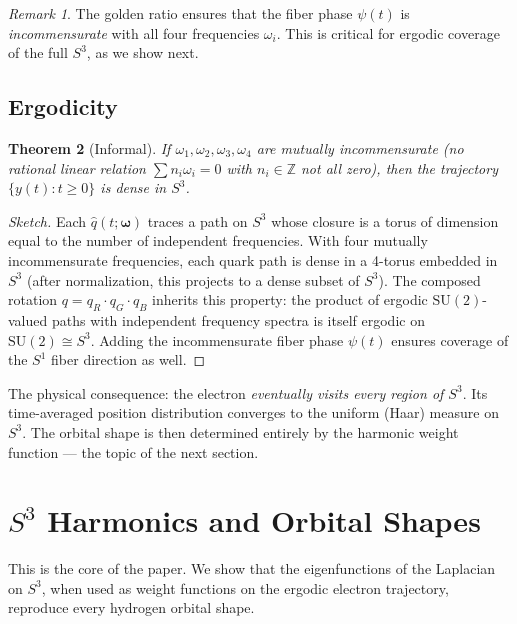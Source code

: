 \documentclass[12pt, a4paper]{article}
\newtheorem{theorem}{Theorem}[section]
\theoremstyle{definition}
\theoremstyle{remark}
\newtheorem{remark}[theorem]{Remark}
\newcommand{\Sthree}{S^3}
\newcommand{\Sone}{S^1}
\newcommand{\SU}{\mathrm{SU}(2)}
\newcommand{\Z}{\mathbb{Z}}
\begin{document}
\begin{remark}
The golden ratio ensures that the fiber phase $\psi(t)$ is
\emph{incommensurate} with all four frequencies $\omega_i$. This is critical
for ergodic coverage of the full $\Sthree$, as we show next.
\end{remark}

\subsection{Ergodicity}

\begin{theorem}[Informal]
\label{thm:ergodic}
If $\omega_1, \omega_2, \omega_3, \omega_4$ are mutually incommensurate
(no rational linear relation $\sum n_i \omega_i = 0$ with
$n_i \in \Z$ not all zero), then the trajectory
$\{y(t) : t \geq 0\}$ is dense in $\Sthree$.
\end{theorem}

\begin{proof}[Sketch]
Each $\hat{q}(t; \boldsymbol{\omega})$ traces a path on $\Sthree$ whose
closure is a torus of dimension equal to the number of independent
frequencies. With four mutually incommensurate frequencies, each quark path
is dense in a 4-torus embedded in $\Sthree$ (after normalization, this
projects to a dense subset of $\Sthree$). The composed rotation
$q = q_R \cdot q_G \cdot q_B$ inherits this property: the product of
ergodic $\SU$-valued paths with independent frequency spectra is itself
ergodic on $\SU \cong \Sthree$. Adding the incommensurate fiber phase
$\psi(t)$ ensures coverage of the $\Sone$ fiber direction as well.
\end{proof}

The physical consequence: the electron \emph{eventually visits every region
of $\Sthree$}. Its time-averaged position distribution converges to the
uniform (Haar) measure on $\Sthree$. The orbital shape is then determined
entirely by the harmonic weight function --- the topic of the next section.


\section{$\Sthree$ Harmonics and Orbital Shapes}
\label{sec:harmonics}

This is the core of the paper. We show that the eigenfunctions of the
Laplacian on $\Sthree$, when used as weight functions on the ergodic
electron trajectory, reproduce every hydrogen orbital shape.
\end{document}
